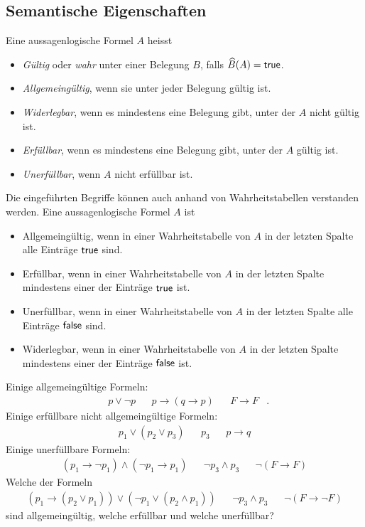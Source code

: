 \subsection*{Semantische Eigenschaften}

\begin{df}
    Eine aussagenlogische Formel $A$ heisst
    \begin{itemize}
        \item \textit{Gültig} oder \textit{wahr} unter einer Belegung $B$, falls $\widehat{B}(A)=\mathsf{true}$.
        \item \textit{Allgemeingültig}, wenn sie unter jeder Belegung gültig ist.
        \item \textit{Widerlegbar}, wenn es mindestens eine Belegung gibt, unter der $A$ nicht gültig ist.
        \item \textit{Erfüllbar}, wenn es mindestens eine Belegung gibt, unter der $A$ gültig ist.
        \item \textit{Unerfüllbar}, wenn $A$ nicht erfüllbar ist.
    \end{itemize}
\end{df}

\begin{rk}
    Die eingeführten Begriffe können auch anhand von Wahrheitstabellen verstanden werden. Eine aussagenlogische Formel $A$ ist
    \begin{itemize}
        \item Allgemeingültig, wenn in einer Wahrheitstabelle von $A$ in der letzten Spalte alle Einträge $\mathsf{true}$ sind.
        \item Erfüllbar, wenn in einer Wahrheitstabelle von $A$ in der letzten Spalte mindestens einer der Einträge $\mathsf{true}$ ist.
        \item Unerfüllbar, wenn in einer Wahrheitstabelle von $A$ in der letzten Spalte alle Einträge $\mathsf{false}$ sind.
        \item Widerlegbar, wenn in einer Wahrheitstabelle von $A$ in der letzten Spalte mindestens einer der Einträge $\mathsf{false}$ ist.
    \end{itemize}
\end{rk}

\begin{bsp}
    Einige allgemeingültige Formeln:
    \begin{align*}
    &p\lor\neg p& &p\to (q\to p)& &F\to F&.
    \end{align*}
    Einige erfüllbare  nicht allgemeingültige Formeln:
    \begin{align*}
    &p_1\lor (p_2\lor p_3)& &p_3& &p\to q&
    \end{align*}
    Einige unerfüllbare Formeln:
    \begin{align*}
    &(p_1\to\neg p_1)\land(\neg p_1\to p_1)& &\neg p_3\land p_3& &\neg (F\to F)&
    \end{align*}
    Welche der Formeln
    \begin{align*}
    &(p_1\to (p_2\lor p_1))\lor(\neg p_1\lor (p_2\land p_1))& &\neg p_3\land p_3& &\neg (F\to \neg F)&
    \end{align*}
    sind allgemeingültig, welche erfüllbar und welche unerfüllbar?
\end{bsp}



